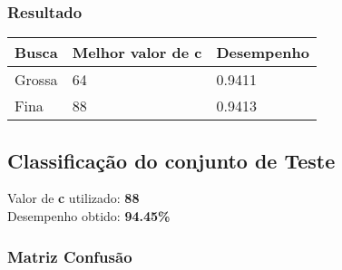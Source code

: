 \documentclass[a4paper]{article}
\begin{document}
\subsubsection{Resultado}

\begin{table}[H]
    \centering
    \begin{tabular}{|l|l|l|}
        \hline
        \textbf{Busca} & \textbf{Melhor valor de c} & \textbf{Desempenho} \\ \hline
        Grossa         & 64                         & 0.9411              \\ \hline
        Fina           & 88                         & 0.9413              \\ \hline
    \end{tabular}
\end{table}


\subsection{Classificação do conjunto de Teste}

Valor de \textbf{c} utilizado: \textbf{88} \\
Desempenho obtido: \textbf{94.45\%}


\subsubsection{Matriz Confusão}
\end{document}
